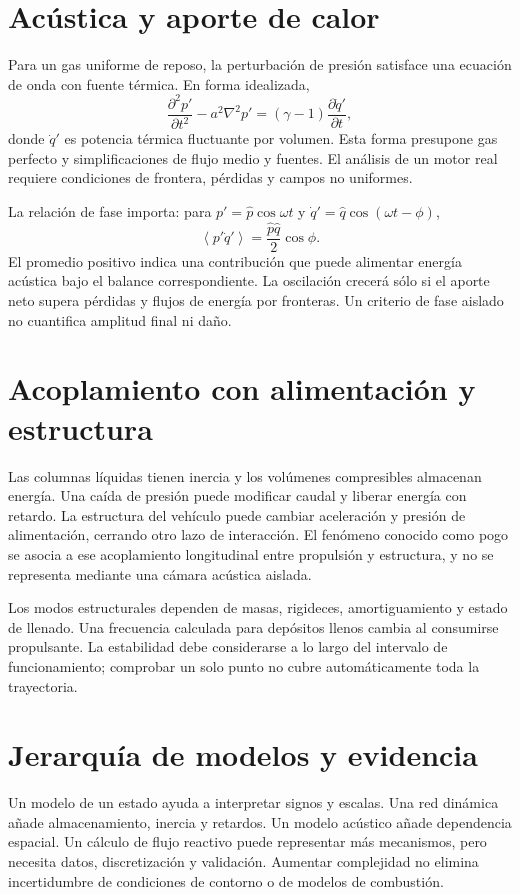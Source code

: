 \section{Acústica y aporte de calor}
Para un gas uniforme de reposo, la perturbación de presión satisface una ecuación de onda con fuente térmica. En forma idealizada,
\[
 \frac{\partial^2p'}{\partial t^2}-a^2\nabla^2p'
 =(\gamma-1)\frac{\partial\dot q'}{\partial t},
\]
donde $\dot q'$ es potencia térmica fluctuante por volumen. Esta forma presupone gas perfecto y simplificaciones de flujo medio y fuentes. El análisis de un motor real requiere condiciones de frontera, pérdidas y campos no uniformes.

La relación de fase importa: para $p'=\widehat p\cos\omega t$ y $\dot q'=\widehat q\cos(\omega t-\phi)$,
\[
 \left\langle p'\dot q'\right\rangle
 =\frac{\widehat p\widehat q}{2}\cos\phi.
\]
El promedio positivo indica una contribución que puede alimentar energía acústica bajo el balance correspondiente. La oscilación crecerá sólo si el aporte neto supera pérdidas y flujos de energía por fronteras. Un criterio de fase aislado no cuantifica amplitud final ni daño.
\section{Acoplamiento con alimentación y estructura}
Las columnas líquidas tienen inercia y los volúmenes compresibles almacenan energía. Una caída de presión puede modificar caudal y liberar energía con retardo. La estructura del vehículo puede cambiar aceleración y presión de alimentación, cerrando otro lazo de interacción. El fenómeno conocido como pogo se asocia a ese acoplamiento longitudinal entre propulsión y estructura, y no se representa mediante una cámara acústica aislada.\cite{MIT22}

Los modos estructurales dependen de masas, rigideces, amortiguamiento y estado de llenado. Una frecuencia calculada para depósitos llenos cambia al consumirse propulsante. La estabilidad debe considerarse a lo largo del intervalo de funcionamiento; comprobar un solo punto no cubre automáticamente toda la trayectoria.
\section{Jerarquía de modelos y evidencia}
Un modelo de un estado ayuda a interpretar signos y escalas. Una red dinámica añade almacenamiento, inercia y retardos. Un modelo acústico añade dependencia espacial. Un cálculo de flujo reactivo puede representar más mecanismos, pero necesita datos, discretización y validación. Aumentar complejidad no elimina incertidumbre de condiciones de contorno o de modelos de combustión.

